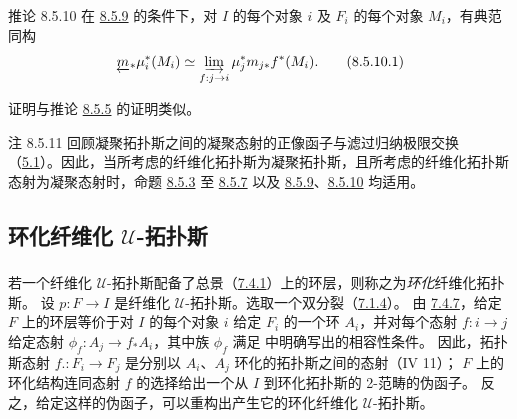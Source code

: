 \begin{enonce*}{推论 8.5.10}
在 \hyperref[VI.prop8.5.9]{8.5.9} 的条件下，对 $I$ 的每个对象 $i$ 及 $F_i$ 的每个对象
$M_i$，有典范同构
\begin{equation*}
\underleftarrow{m}_{\ast} \mu^{\ast}_i (M_i) \simeq
\varinjlim_{f:j\to i} \mu^{\ast}_{j} m_{j\ast}f^{\ast}
(M_{i}){\quoi}.\tag{8.5.10.1}
\end{equation*}
\end{enonce*}

证明与推论 \hyperref[VI.cor8.5.5]{8.5.5} 的证明类似。

\begin{enonce*}[remark]{注 8.5.11}
回顾凝聚拓扑斯之间的凝聚态射的正像函子与滤过归纳极限交换
（\hyperref[VI.thm5.1]{5.1}）。因此，当所考虑的纤维化拓扑斯为凝聚拓扑斯，且所考虑的纤维化拓扑斯态射为凝聚态射时，命题
\hyperref[VI.prop8.5.3]{8.5.3} 至 \hyperref[VI.cor8.5.7]{8.5.7} 以及
\hyperref[VI.prop8.5.9]{8.5.9}、\hyperref[VI.cor8.5.10]{8.5.10} 均适用。
\end{enonce*}




\subsection{环化纤维化 $𝒰$-拓扑斯}

\subsubsection{}

若一个纤维化 $𝒰$-拓扑斯配备了总景（\hyperref[VI.def7.4.1]{7.4.1}）上的环层，则称之为\emph{环化}纤维化拓扑斯。
设 $p : F \to I$ 是纤维化 $𝒰$-拓扑斯。选取一个双分裂\pageoriginale{}（\hyperref[VI.subsubsec7.1.4]{7.1.4}）。
由 \hyperref[VI.prop7.4.7]{7.4.7}，给定 $F$ 上的环层等价于对 $I$ 的每个对象 $i$ 给定
$F_i$ 的一个环 $A_i$，并对每个态射 $f : i \to j$ 给定态射
$\phi_f : A_j \to f_{\ast} A_i$，其中族 $\phi_f$ 满足 \loccit{} 中明确写出的相容性条件。
因此，拓扑斯态射 $f. : F_i \to F_j$ 是分别以 $A_i$、$A_j$ 环化的拓扑斯之间的态射（IV 11）；
$F$ 上的环化结构连同态射 $f$ 的选择给出一个从 $I$ 到环化拓扑斯的 2-范畴的伪函子。
反之，给定这样的伪函子，可以重构出产生它的环化纤维化 $𝒰$-拓扑斯。

